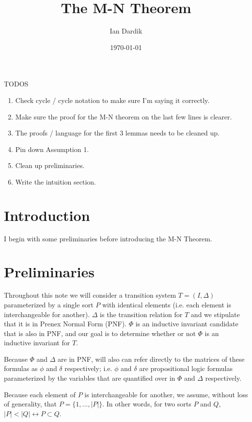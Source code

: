 \documentclass[12pt]{article}
\title{The M-N Theorem}
\author{Ian Dardik}
\date{\today}
\theoremstyle{definition}
\theoremstyle{remark}
\begin{document}
\maketitle

\noindent TODOS
\begin{enumerate}
  \item Check cycle / cycle notation to make sure I'm saying it correctly.
  \item Make sure the proof for the M-N theorem on the last few lines is clearer.
  \item The proofs / language for the first 3 lemmas needs to be cleaned up.
  \item Pin down Assumption 1.
  \item Clean up preliminaries.
  \item Write the intuition section.
\end{enumerate}

\section{Introduction}
I begin with some preliminaries before introducing the M-N Theorem.


\section{Preliminaries}
Throughout this note we will consider a transition system $T=(I,\Delta)$ parameterized by a single sort $P$ with identical elements (i.e. each element is interchangeable for another).  $\Delta$ is the transition relation for $T$ and we stipulate that it is in Prenex Normal Form (PNF).  $\Phi$ is an inductive invariant candidate that is also in PNF, and our goal is to determine whether or not $\Phi$ is an inductive invariant for $T$.

Because $\Phi$ and $\Delta$ are in PNF, will also can refer directly to the matrices of these formulas as $\phi$ and $\delta$ respectively; i.e. $\phi$ and $\delta$ are propositional logic formulas parameterized by the variables that are quantified over in $\Phi$ and $\Delta$ respectively.

Because each element of $P$ is interchangeable for another, we assume, without loss of generality, that $P = \{1,...,|P|\}$.  In other words, for two sorts $P$ and $Q$, $|P| < |Q| \leftrightarrow P \subset Q$.
\end{document}

